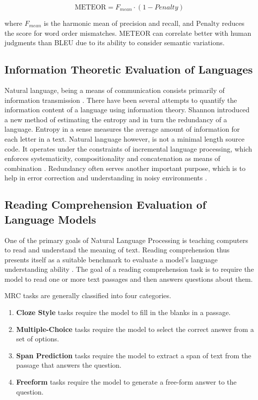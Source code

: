 \begin{equation}
\text{METEOR} = F_{mean} \cdot (1 - Penalty)
\end{equation}

where $ F_{mean} $ is the harmonic mean of precision and recall, and $\text{Penalty}$ reduces the score for word order mismatches. METEOR can correlate better with human judgments than BLEU 
due to its ability to consider semantic variations.


\subsection{Information Theoretic Evaluation of Languages}
Natural language, being a means of communication consists primarily of information transmission \cite{debowskiInformationTheoryLanguage2020}. There have
been several attempts to quantify the information content of a language using information theory. Shannon \cite{shannonPredictionEntropyPrinted1951} introduced a new
method of estimating the entropy and in turn the redundancy of a language. Entropy in a sense measures the average amount of information for each letter in a text.
Natural language however, is not a minimal length source code. It operates under the constraints of incremental language processing, which enforces
systematicity, compositionality and concatenation as means of combination  \cite{futrellInformationTheoryBridge2022}. Redundancy often serves another
important purpose, which is to help in error correction and understanding in noisy environments \cite{gibsonHowEfficiencyShapes2019}.

\subsection{Reading Comprehension Evaluation of Language Models}
One of the primary goals of Natural Language Processing is teaching computers to read and understand the meaning of text. Reading comprehension 
thus presents itself as a suitable benchmark to evaluate a model's language understanding ability \cite{zengSurveyMachineReading2020}.  The goal 
of a reading comprehension task is to require the model to read one or more text passages and then answers questions about them. 

MRC tasks are generally classified into four categories. 
\begin{enumerate}
    \item \textbf{Cloze Style} tasks require the model to fill in the blanks in a passage. 
    \item \textbf{Multiple-Choice} tasks require the model to select the correct answer from a set of options.
    \item \textbf{Span Prediction} tasks require the model to extract a span of text from the passage that answers the question.
    \item \textbf{Freeform} tasks require the model to generate a free-form answer to the question.
\end{enumerate}


